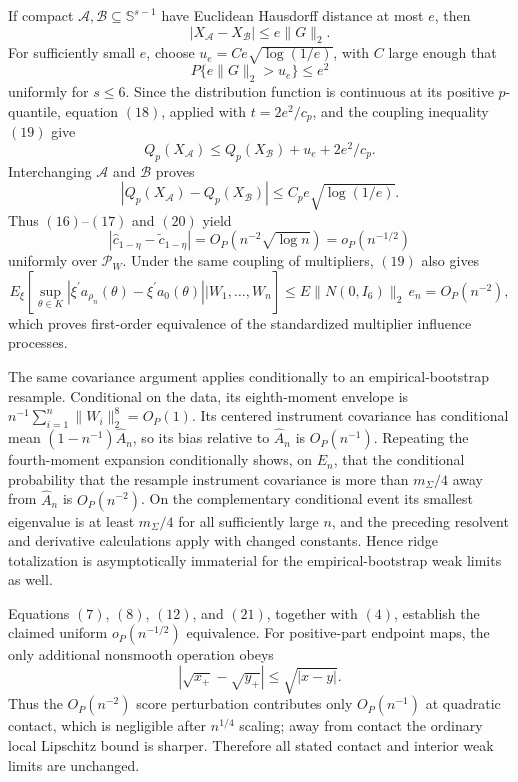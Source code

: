 If compact \(\mathcal A,\mathcal B\subseteq\mathbb S^{s-1}\) have Euclidean Hausdorff distance at most \(e\), then
\[
 |X_{\mathcal A}-X_{\mathcal B}|\leq e\|G\|_2. \tag{19}
\]
For sufficiently small \(e\), choose \(u_e=C e\sqrt{\log(1/e)}\), with \(C\) large enough that
\[
 P\{e\|G\|_2>u_e\}\leq e^2
\]
uniformly for \(s\leq6\). Since the distribution function is continuous at its positive \(p\)-quantile, equation \((18)\), applied with \(t=2e^2/c_p\), and the coupling inequality \((19)\) give
\[
 Q_p(X_{\mathcal A})\leq Q_p(X_{\mathcal B})+u_e+2e^2/c_p.
\]
Interchanging \(\mathcal A\) and \(\mathcal B\) proves
\[
 |Q_p(X_{\mathcal A})-Q_p(X_{\mathcal B})|
 \leq C_p e\sqrt{\log(1/e)}. \tag{20}
\]
Thus \((16)\)--\((17)\) and \((20)\) yield
\[
 |\widehat c_{1-\eta}-\widetilde c_{1-\eta}|
 =O_P(n^{-2}\sqrt{\log n})=o_P(n^{-1/2}) \tag{21}
\]
uniformly over \(\mathcal P_W\). Under the same coupling of multipliers, \((19)\) also gives
\[
 E_{\xi}\left[
 \sup_{\theta\in K}|\xi^{\prime}a_{\rho_n}(\theta)-\xi^{\prime}a_0(\theta)|
 \mathrel{\big|}W_1,\ldots,W_n\right]
 \leq E\|N(0,I_6)\|_2\,e_n=O_P(n^{-2}),
\]
which proves first-order equivalence of the standardized multiplier influence processes.

The same covariance argument applies conditionally to an empirical-bootstrap resample. Conditional on the data, its eighth-moment envelope is \(n^{-1}\sum_{i=1}^n\|W_i\|_2^8=O_P(1)\). Its centered instrument covariance has conditional mean \((1-n^{-1})\widehat A_n\), so its bias relative to \(\widehat A_n\) is \(O_P(n^{-1})\). Repeating the fourth-moment expansion conditionally shows, on \(E_n\), that the conditional probability that the resample instrument covariance is more than \(m_{\Sigma}/4\) away from \(\widehat A_n\) is \(O_P(n^{-2})\). On the complementary conditional event its smallest eigenvalue is at least \(m_{\Sigma}/4\) for all sufficiently large \(n\), and the preceding resolvent and derivative calculations apply with changed constants. Hence ridge totalization is asymptotically immaterial for the empirical-bootstrap weak limits as well.

Equations \((7)\), \((8)\), \((12)\), and \((21)\), together with \((4)\), establish the claimed uniform \(o_P(n^{-1/2})\) equivalence. For positive-part endpoint maps, the only additional nonsmooth operation obeys
\[
 |\sqrt{x_+}-\sqrt{y_+}|\leq\sqrt{|x-y|}.
\]
Thus the \(O_P(n^{-2})\) score perturbation contributes only \(O_P(n^{-1})\) at quadratic contact, which is negligible after \(n^{1/4}\) scaling; away from contact the ordinary local Lipschitz bound is sharper. Therefore all stated contact and interior weak limits are unchanged.

